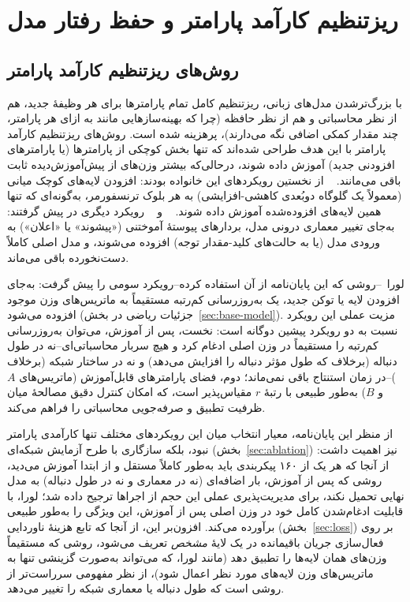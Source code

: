 \section{ریزتنظیم کارآمد پارامتر و حفظ رفتار مدل}
\label{sec:lit-peft}

\subsection{روش‌های ریزتنظیم کارآمد پارامتر}
با بزرگ‌ترشدن مدل‌های زبانی، ریزتنظیم کامل تمام پارامترها برای هر وظیفهٔ جدید، هم از نظر محاسباتی و هم از نظر حافظه (چرا که بهینه‌سازهایی مانند
به ازای هر پارامتر، چند مقدار کمکی اضافی نگه می‌دارند)، پرهزینه شده است. روش‌های ریزتنظیم کارآمد پارامتر
با این هدف طراحی شده‌اند که تنها بخش کوچکی از پارامترها (یا پارامترهای افزودنی جدید) آموزش داده شوند، درحالی‌که بیشتر وزن‌های از پیش‌آموزش‌دیده ثابت باقی می‌مانند.
~\cite{houlsby2019adapters}
از نخستین رویکردهای این خانواده بودند: افزودن لایه‌های کوچک میانی (معمولاً یک گلوگاه دوبُعدی کاهشی-افزایشی) به هر بلوک ترنسفورمر، به‌گونه‌ای که تنها همین لایه‌های افزوده‌شده آموزش داده شوند.
~\cite{li2021prefixtuning}
و
~\cite{lester2021prompttuning}
رویکرد دیگری در پیش گرفتند: به‌جای تغییر معماری درونی مدل، بردارهای پیوستهٔ آموختنی («پیشوند» یا «اعلان») به ورودی مدل (یا به حالت‌های کلید-مقدار توجه) افزوده می‌شوند، و مدل اصلی کاملاً دست‌نخورده باقی می‌ماند.

لورا~\cite{hu2021lora}--روشی که این پایان‌نامه از آن استفاده کرده--رویکرد سومی را پیش گرفت: به‌جای افزودن لایه یا توکن جدید، یک به‌روزرسانی کم‌رتبه مستقیماً به ماتریس‌های وزن موجود افزوده می‌شود (جزئیات ریاضی در بخش~\ref{sec:base-model}). مزیت عملی این رویکرد نسبت به دو رویکرد پیشین دوگانه است: نخست، پس از آموزش، می‌توان به‌روزرسانی کم‌رتبه را مستقیماً در وزن اصلی ادغام کرد و هیچ سربار محاسباتی‌ای--نه در طول دنباله (برخلاف
که طول مؤثر دنباله را افزایش می‌دهد) و نه در ساختار شبکه (برخلاف
)--در زمان استنتاج باقی نمی‌ماند؛ دوم، فضای پارامترهای قابل‌آموزش (ماتریس‌های
$A$
و
$B$) به‌طور طبیعی با رتبهٔ
$r$
مقیاس‌پذیر است، که امکان کنترل دقیق مصالحهٔ میان ظرفیت تطبیق و صرفه‌جویی محاسباتی را فراهم می‌کند.

از منظر این پایان‌نامه، معیار انتخاب میان این رویکردهای مختلف
تنها کارآمدی پارامتر نبود، بلکه سازگاری با طرح آزمایش شبکه‌ای (بخش~\ref{sec:ablation}) نیز اهمیت داشت: از آنجا که هر یک از ۱۶۰ پیکربندی باید به‌طور کاملاً مستقل و از ابتدا آموزش می‌دید، روشی که پس از آموزش، بار اضافه‌ای (نه در معماری و نه در طول دنباله) به مدل نهایی تحمیل نکند، برای مدیریت‌پذیری عملی این حجم از اجراها ترجیح داده شد؛ لورا، با قابلیت ادغام‌شدن کامل خود در وزن اصلی پس از آموزش، این ویژگی را به‌طور طبیعی برآورده می‌کند. افزون‌بر این، از آنجا که تابع هزینهٔ ناوردایی (بخش~\ref{sec:loss}) بر روی فعال‌سازی جریان باقیمانده در یک لایهٔ \emph{مشخص} تعریف می‌شود، روشی که مستقیماً وزن‌های همان لایه‌ها را تطبیق دهد (مانند لورا، که می‌تواند به‌صورت گزینشی تنها به ماتریس‌های وزن لایه‌های مورد نظر اعمال شود)، از نظر مفهومی سرراست‌تر از روشی است که طول دنباله یا معماری شبکه را تغییر می‌دهد.

